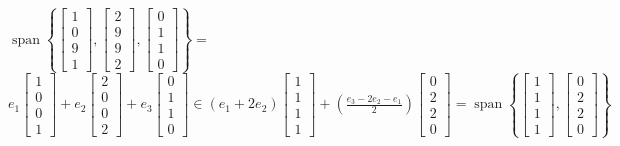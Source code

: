 \documentclass[11pt]{article}
\begin{document}
\begin{enumerate}[{\bf Q1.}]
\begin{enumerate}
			$\operatorname{span}\left\{\left[\begin{array}{l}1 \\ 0 \\ 9 \\ 1\end{array}\right],\left[\begin{array}{l}2 \\ 9 \\ 9 \\ 2\end{array}\right],\left[\begin{array}{l}0 \\ 1 \\ 1 \\ 0\end{array}\right]\right\}= $
			$e_1\left[\begin{array}{l}1 \\ 0 \\ 0 \\ 1\end{array}\right]+e_2\left[\begin{array}{l}2 \\ 0 \\ 0 \\ 2\end{array}\right]+e_3\left[\begin{array}{l}0 \\ 1 \\ 1 \\ 0\end{array}\right] \in \left(e_1+2 e_2\right)\left[\begin{array}{l}1 \\ 1 \\ 1 \\ 1\end{array}\right]+\left(\frac{e_3-2 e_2-e_1}{2}\right)\left[\begin{array}{l}0 \\ 2 \\ 2 \\ 0\end{array}\right]=\operatorname{span}\left\{\left[\begin{array}{l}1 \\ 1 \\ 1 \\ 1\end{array}\right],\left[\begin{array}{l}0 \\ 2 \\ 2 \\ 0\end{array}\right]\right\}$ \newline
			

\end{enumerate}
\end{enumerate}
\end{document}
